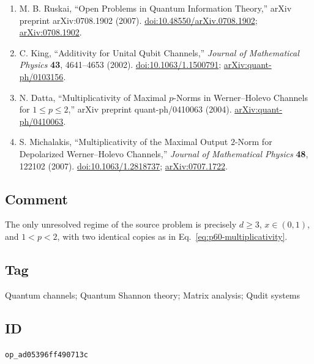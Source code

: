 \begin{enumerate}[label={},leftmargin=4.8em,labelsep=0.5em]
  \footnotesize
  \item[\textup{[Rus07]}]\label{ref:p60-ruskai}
  M. B. Ruskai, ``Open Problems in Quantum Information Theory,''
  arXiv preprint arXiv:0708.1902 (2007).
  \newline
  \href{https://doi.org/10.48550/arXiv.0708.1902}%
       {doi:10.48550/arXiv.0708.1902};
  \href{https://arxiv.org/abs/0708.1902}{arXiv:0708.1902}.

  \item[\textup{[Kin02]}]\label{ref:p60-king}
  C. King, ``Additivity for Unital Qubit Channels,''
  \emph{Journal of Mathematical Physics} \textbf{43}, 4641--4653 (2002).
  \href{https://doi.org/10.1063/1.1500791}{doi:10.1063/1.1500791};
  \href{https://arxiv.org/abs/quant-ph/0103156}%
       {arXiv:quant-ph/0103156}.

  \item[\textup{[Dat04]}]\label{ref:p60-datta}
  N. Datta, ``Multiplicativity of Maximal $p$-Norms in Werner--Holevo
  Channels for $1\leq p\leq2$,'' arXiv preprint quant-ph/0410063 (2004).
  \href{https://arxiv.org/abs/quant-ph/0410063}%
       {arXiv:quant-ph/0410063}.

  \item[\textup{[Mic07]}]\label{ref:p60-michalakis}
  S. Michalakis, ``Multiplicativity of the Maximal Output $2$-Norm for
  Depolarized Werner--Holevo Channels,''
  \emph{Journal of Mathematical Physics} \textbf{48}, 122102 (2007).
  \href{https://doi.org/10.1063/1.2818737}{doi:10.1063/1.2818737};
  \href{https://arxiv.org/abs/0707.1722}{arXiv:0707.1722}.
\end{enumerate}

\subsection*{Comment}

The only unresolved regime of the source problem is precisely
$d\geq3$, $x\in(0,1)$, and $1<p<2$, with two identical copies as in
Eq.~\eqref{eq:p60-multiplicativity}.

\subsection*{Tag}

Quantum channels; Quantum Shannon theory; Matrix analysis; Qudit systems

\subsection*{ID}

\texttt{op\_ad05396ff490713c}
